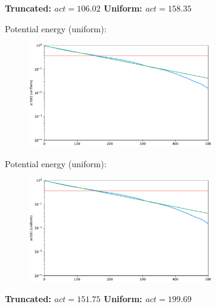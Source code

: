 \documentclass[12pt, two sided]{article}
\begin{document}
\textbf{Truncated: $act = 106.02$ Uniform: $act = 158.35$}

Potential energy (uniform):

\begin{figure}[h!]
\includegraphics[width=8cm]{../figures/Act_kinetic_uniform.pdf}
\end{figure}

Potential energy (uniform):

\begin{figure}[h!]
\includegraphics[width=8cm]{../figures/Act_kinetic_uniform.pdf}
\end{figure}

\textbf{Truncated: $act = 151.75$ Uniform: $act = 199.69$}



{} 
 \singlespacing


\doublespacing
\end{document}

